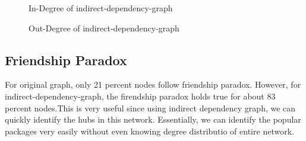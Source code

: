 \begin{figure}[htbp]
\centering
{}
\caption{In-Degree of indirect-dependency-graph}
\label{fig:indegree}
\end{figure}

\begin{figure}[htbp]
\centering
{}
\caption{Out-Degree of indirect-dependency-graph}
\label{fig:outdegree}
\end{figure}


\subsection{Friendship Paradox} \label{friend}
For original graph, only 21 percent nodes follow friendship paradox. However,
 for
indirect-dependency-graph, the firendship paradox holds true for about 83
percent
nodes.This is very useful since using indirect dependency graph, we can
quickly identify the hubs in this network. Essentially, we can identify the
popular packages very easily without even knowing degree distributio of
entire network.

